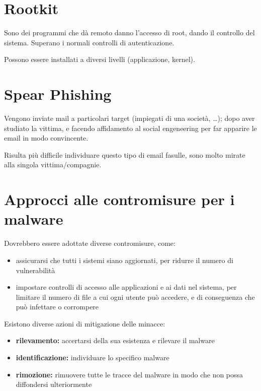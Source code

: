 \section{Rootkit}
Sono dei programmi che dà remoto danno l'accesso di root, dando il controllo del sistema. Superano
i normali controlli di autenticazione.

Possono essere installati a diversi livelli (applicazione, kernel).

\section{Spear Phishing}
Vengono inviate mail a particolari target (impiegati di una società, \dots); 
dopo aver studiato la vittima, e facendo affidamento al social engeneering per 
far apparire le email in modo convincente.

Risulta più difficile individuare questo tipo di email fasulle, sono molto
mirate alla singola vittima/compagnie.


\section{Approcci alle contromisure per i malware}
Dovrebbero essere adottate diverse contromisure, come:
\begin{itemize}
    \item assicurarsi che tutti i sistemi siano aggiornati, per ridurre il numero di vulnerabilità
    \item impostare controlli di accesso alle applicazioni e ai dati nel sistema, per limitare il numero di file a cui ogni utente può accedere, e
    di conseguenza che può infettare o corrompere
\end{itemize}

Esistono diverse azioni di mitigazione delle minacce:
\begin{itemize}
    \item \textbf{rilevamento:} accertarsi della sua esistenza e rilevare il malware
    \item \textbf{identificazione:} individuare lo specifico malware 
    \item \textbf{rimozione:} rimuovere tutte le tracce del malware in modo che non possa diffondersi ulteriormente
\end{itemize}





